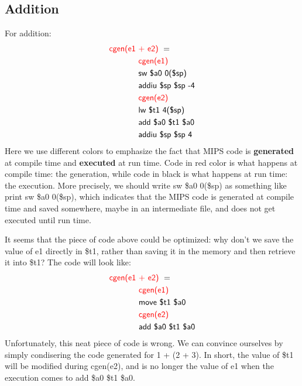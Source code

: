 \subsection{Addition}
For addition:
\begin{equation*}\begin{split}
\textsf{\color{red}cgen(e1 }&\textsf{\color{red}+ e2) }=\\
&\textsf{\color{red}cgen(e1)}\\
&\textsf{sw \$a0 0(\$sp)}\\
&\textsf{addiu \$sp \$sp -4}\\
&\textsf{\color{red} cgen(e2)}\\
&\textsf{lw \$t1 4(\$sp)}\\
&\textsf{add \$a0 \$t1 \$a0}\\
&\textsf{addiu \$sp \$sp 4}
\end{split}\end{equation*}
Here we use different colors to emphasize the fact that MIPS code is \textbf{generated} at compile time and \textbf{executed} at run time. Code in red color is what happens at compile time: the generation, while code in black is what happens at run time: the execution. More precisely, we should write \textsf{sw \$a0 0(\$sp)} as something like \textsf{{\color{red}print} sw \$a0 0(\$sp)}, which indicates that the MIPS code is generated at compile time and saved somewhere, maybe in an intermediate file, and does not get executed until run time.

It seems that the piece of code above could be optimized: why don't we save the value of e1 directly in \$t1, rather than saving it in the memory and then retrieve it into \$t1? The code will look like:
\begin{equation*}\begin{split}
\textsf{\color{red}cgen(e1 }&\textsf{\color{red}+ e2) }=\\
&\textsf{\color{red}cgen(e1)}\\
&\textsf{move \$t1 \$a0}\\
&\textsf{\color{red} cgen(e2)}\\
&\textsf{add \$a0 \$t1 \$a0}
\end{split}\end{equation*}
Unfortunately, this neat piece of code is wrong. We can convince ourselves by simply condisering the code generated for 1 + (2 + 3). In short, the value of \$t1 will be modified during \textsf{cgen(e2)}, and is no longer the value of e1 when the execution comes to \textsf{add \$a0 \$t1 \$a0}.

